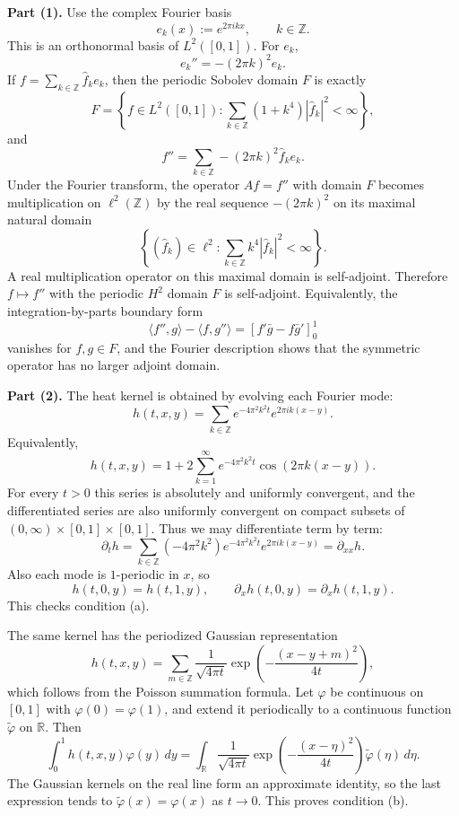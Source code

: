 \begin{solution}
\textbf{Part (1).}
Use the complex Fourier basis
\[
e_k(x):=e^{2\pi ikx},\qquad k\in\mathbb{Z}.
\]
This is an orthonormal basis of $L^2([0,1])$.  For $e_k$,
\[
e_k''=-(2\pi k)^2e_k.
\]
If $f=\sum_{k\in\mathbb{Z}}\hat f_k e_k$, then the periodic Sobolev domain $F$ is exactly
\[
F=\left\{f\in L^2([0,1]):
\sum_{k\in\mathbb{Z}}(1+k^4)|\hat f_k|^2<\infty\right\},
\]
and
\[
f''=\sum_{k\in\mathbb{Z}}-(2\pi k)^2\hat f_k e_k.
\]
Under the Fourier transform, the operator $A f=f''$ with domain $F$ becomes multiplication on $\ell^2(\mathbb{Z})$ by the real sequence $-(2\pi k)^2$ on its maximal natural domain
\[
\left\{(\hat f_k)\in\ell^2:
\sum_{k\in\mathbb{Z}}k^4|\hat f_k|^2<\infty\right\}.
\]
A real multiplication operator on this maximal domain is self-adjoint.  Therefore $f\mapsto f''$ with the periodic $H^2$ domain $F$ is self-adjoint.  Equivalently, the integration-by-parts boundary form
\[
\langle f'',g\rangle-\langle f,g''\rangle
=\left[f'\bar g-f\bar g'\right]_{0}^{1}
\]
vanishes for $f,g\in F$, and the Fourier description shows that the symmetric operator has no larger adjoint domain.

\textbf{Part (2).}
The heat kernel is obtained by evolving each Fourier mode:
\[
h(t,x,y)
=\sum_{k\in\mathbb{Z}}e^{-4\pi^2k^2t}e^{2\pi ik(x-y)}.
\]
Equivalently,
\[
h(t,x,y)
=1+2\sum_{k=1}^{\infty}e^{-4\pi^2k^2t}\cos(2\pi k(x-y)).
\]
For every $t>0$ this series is absolutely and uniformly convergent, and the differentiated series are also uniformly convergent on compact subsets of $(0,\infty)\times[0,1]\times[0,1]$.  Thus we may differentiate term by term:
\[
\partial_t h
=\sum_{k\in\mathbb{Z}}(-4\pi^2k^2)e^{-4\pi^2k^2t}e^{2\pi ik(x-y)}
=\partial_{xx}h.
\]
Also each mode is $1$-periodic in $x$, so
\[
h(t,0,y)=h(t,1,y),
\qquad
\partial_xh(t,0,y)=\partial_xh(t,1,y).
\]
This checks condition (a).

The same kernel has the periodized Gaussian representation
\[
h(t,x,y)=\sum_{m\in\mathbb{Z}}\frac{1}{\sqrt{4\pi t}}
\exp\left(-\frac{(x-y+m)^2}{4t}\right),
\]
which follows from the Poisson summation formula.  Let $\varphi$ be continuous on $[0,1]$ with $\varphi(0)=\varphi(1)$, and extend it periodically to a continuous function $\tilde\varphi$ on $\mathbb{R}$.  Then
\[
\int_0^1h(t,x,y)\varphi(y)\,dy
=\int_{\mathbb{R}}\frac{1}{\sqrt{4\pi t}}
\exp\left(-\frac{(x-\eta)^2}{4t}\right)\tilde\varphi(\eta)\,d\eta.
\]
The Gaussian kernels on the real line form an approximate identity, so the last expression tends to $\tilde\varphi(x)=\varphi(x)$ as $t\to 0$.  This proves condition (b).


\end{solution}
